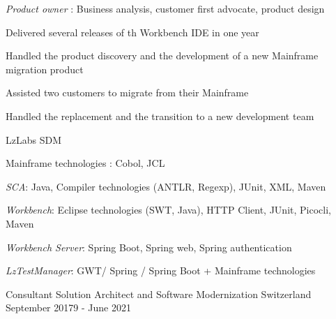\begin{cventries}
{{\begin{cvitems}
                    \item {\emph{Product owner} : Business analysis, customer first advocate, product design }
                    \end{cvitems}
            }
            {
               \begin{cvitems} %
                \item {Delivered several releases of th Workbench IDE in one year }
                \item {Handled the product discovery and the development of a new Mainframe migration product }
                \item {Assisted two customers to migrate from their Mainframe }
                \item {Handled the replacement and the transition to a new development team}
               \end{cvitems}
            }
            {
                \begin{cvitems} %
                    \item{LzLabs SDM}
                    \item{Mainframe technologies : Cobol, JCL}
                    \item{\emph{SCA}: Java, Compiler technologies (ANTLR, Regexp), JUnit, XML, Maven}
                    \item{\emph{Workbench}: Eclipse technologies (SWT, Java), HTTP Client, JUnit, Picocli, Maven}
                    \item{\emph{Workbench Server}: Spring Boot, Spring web, Spring authentication}
                    \item{\emph{LzTestManager}: GWT/ Spring / Spring Boot + Mainframe technologies}
                \end{cvitems}
            }            
    }

    \cventry
    {Consultant} %
    {Solution Architect and Software Modernization} %
    {Switzerland} %
    {September 20179 - June 2021} %
    {}%


\end{cventries}
